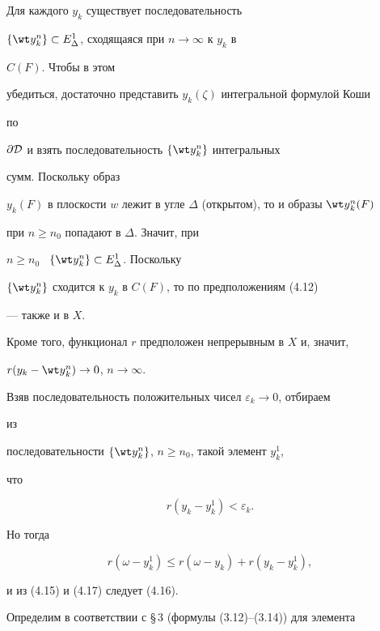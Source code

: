 \begin{pf} 


Для каждого $y_k$ существует последовательность 


$\{\wt y{}^n_k\}\subset E^1_\Delta$, сходящаяся при $n\to\infty$ к $y_k$ в 


$C(F)$. Чтобы в этом 


убедиться, достаточно представить $y_k(\zeta)$ интегральной формулой Коши 


по 


$\partial\cal D$ и взять последовательность $\{\wt y{}^n_k\}$ интегральных 


сумм. Поскольку образ 


$y_k(F)$ в плоскости $w$ лежит в угле $\Delta$ (открытом), то и образы $\wt 


y{}^n_k(F)$ 


при $n\ge n_0$ попадают в $\Delta$. Значит, при 


$n\ge n_0$ \ $\{\wt y{}^n_k\}\subset E^1_\Delta$. Поскольку 


$\{\wt y{}^n_k\}$ сходится к $y_k$ в $C(F)$, то по предположениям (4.12) 


--- также и в $X$. 


Кроме того, функционал $r$ предположен непрерывным в $X$ и, значит, 


$r(y_k-\wt y{}^n_k)\to0$, $n\to\infty$. 


Взяв последовательность положительных чисел $\varepsilon_k\to0$, отбираем 


из 


последовательности $\{\wt y{}^n_k\}$, $n\ge n_0$, такой элемент $y^1_k$, 


что 


\begin{equation} 


r(y_k-y^1_k)<\varepsilon_k. 


\end{equation} 


Но тогда 


$$ 


r(\omega-y^1_k)\le r(\omega-y_k)+r(y_k-y^1_k), 


$$ 


и из (4.15) и (4.17) следует (4.16). 


\end{pf} 


 


Определим в соответствии с \S\,3 (формулы (3.12)--(3.14)) для элемента 


